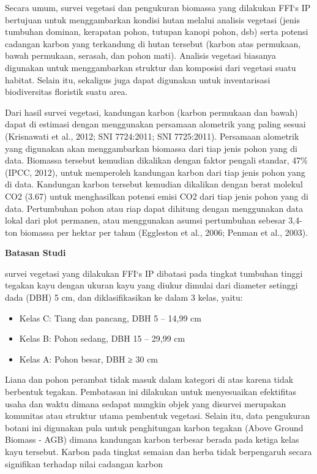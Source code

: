 \documentclass[
]{book}
\providecommand{\tightlist}{%
  \setlength{\itemsep}{0pt}\setlength{\parskip}{0pt}}
\begin{document}
Secara umum, survei vegetasi dan pengukuran biomassa yang dilakukan FFI`s IP bertujuan untuk menggambarkan kondisi hutan melalui analisis vegetasi (jenis tumbuhan dominan, kerapatan pohon, tutupan kanopi pohon, dsb) serta potensi cadangan karbon yang terkandung di hutan tersebut (karbon atas permukaan, bawah permukaan, serasah, dan pohon mati). Analisis vegetasi biasanya digunakan untuk menggambarkan struktur dan komposisi dari vegetasi suatu habitat. Selain itu, sekaligus juga dapat digunakan untuk inventarisasi biodiversitas floristik suatu area.

Dari hasil survei vegetasi, kandungan karbon (karbon permukaan dan bawah) dapat di estimasi dengan menggunakan persamaan alometrik yang paling sesuai (Krisnawati et al., 2012; SNI 7724:2011; SNI 7725:2011). Persamaan alometrik yang digunakan akan menggambarkan biomassa dari tiap jenis pohon yang di data. Biomassa tersebut kemudian dikalikan dengan faktor pengali standar, 47\% (IPCC, 2012), untuk memperoleh kandungan karbon dari tiap jenis pohon yang di data. Kandungan karbon tersebut kemudian dikalikan dengan berat molekul CO2 (3.67) untuk menghasilkan potensi emisi CO2 dari tiap jenis pohon yang di data. Pertumbuhan pohon atau riap dapat dihitung dengan menggunakan data lokal dari plot permanen, atau menggunakan asumsi pertumbuhan sebesar 3,4-ton biomassa per hektar per tahun (Eggleston et al., 2006; Penman et al., 2003).

\textbf{Batasan Studi}

survei vegetasi yang dilakukan FFI`s IP dibatasi pada tingkat tumbuhan tinggi tegakan kayu dengan ukuran kayu yang diukur dimulai dari diameter setinggi dada (DBH) 5 cm, dan diklasifikasikan ke dalam 3 kelas, yaitu:

\begin{itemize}
\tightlist
\item
  Kelas C: Tiang dan pancang, DBH 5 -- 14,99 cm
\item
  Kelas B: Pohon sedang, DBH 15 -- 29,99 cm
\item
  Kelas A: Pohon besar, DBH ≥ 30 cm
\end{itemize}

Liana dan pohon perambat tidak masuk dalam kategori di atas karena tidak berbentuk tegakan. Pembatasan ini dilakukan untuk menyesuaikan efektifitas usaha dan waktu dimana sedapat mungkin objek yang disurvei merupakan komunitas atau struktur utama pembentuk vegetasi. Selain itu, data pengukuran botani ini digunakan pula untuk penghitungan karbon tegakan (Above Ground Biomass - AGB) dimana kandungan karbon terbesar berada pada ketiga kelas kayu tersebut. Karbon pada tingkat semaian dan herba tidak berpengaruh secara signifikan terhadap nilai cadangan karbon
\end{document}
